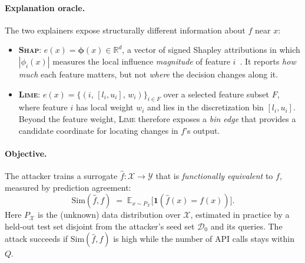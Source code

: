 \documentclass[sigconf,anonymous,review]{acmart}
\begin{document}
\paragraph{Explanation oracle.}
The two explainers expose structurally different information about $f$ near $x$:
\begin{itemize}
  \item \textbf{\textsc{Shap}}: $e(x) = \boldsymbol{\phi}(x) \in \mathbb{R}^{d}$, a vector of
  signed Shapley attributions in which $|\phi_i(x)|$ measures the local influence
  \emph{magnitude} of feature $i$~\cite{lundberg2017shap}. It reports \emph{how much}
  each feature matters, but not \emph{where} the decision changes along it.
  \item \textbf{\textsc{Lime}}: $e(x) = \{(i,\, [l_i, u_i],\, w_i)\}_{i \in F}$ over a
  selected feature subset $F$, where feature $i$ has local weight $w_i$ and lies in
  the discretization bin $[l_i, u_i]$. Beyond the feature weight, \textsc{Lime} therefore
  exposes a \emph{bin edge} that provides a candidate coordinate for locating changes in $f$'s output.
\end{itemize}

\paragraph{Objective.}
The attacker trains a surrogate $\hat{f} : \mathcal{X} \to \mathcal{Y}$ that is
\emph{functionally equivalent} to $f$, measured by prediction agreement:
\begin{equation}
    \mathrm{Sim}(\hat{f}, f) \;=\; \mathbb{E}_{x \sim P_{\mathcal{X}}}
    \bigl[\mathbf{1}(\hat{f}(x) = f(x))\bigr].
    \label{eq:sim}
\end{equation}
Here $P_{\mathcal{X}}$ is the (unknown) data distribution over $\mathcal{X}$,
estimated in practice by a held-out test set disjoint from the attacker's seed set
$\mathcal{D}_{0}$ and its queries.
The attack succeeds if $\mathrm{Sim}(\hat{f}, f)$ is high while the number of API
calls stays within $Q$. 
\end{document}

